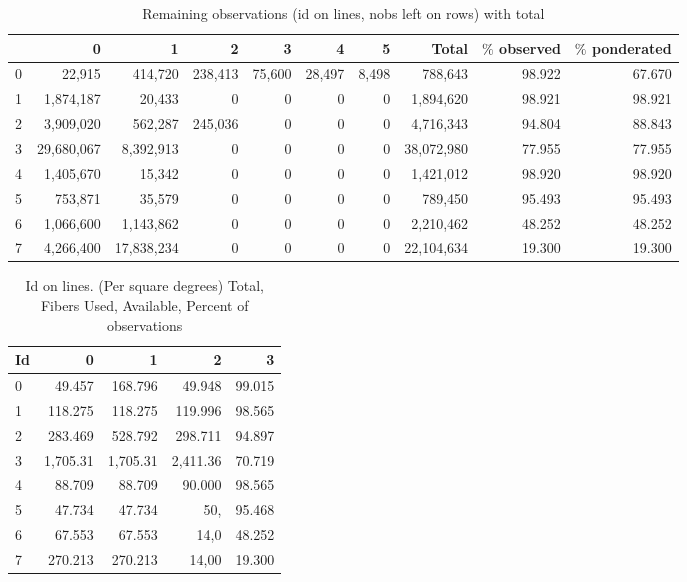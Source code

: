 \documentclass{extarticle}
\begin{document}
\begin{table}[H]\begin{center}
\begin{tabular}{l|rrrrrrrrr}
	~   &         0 &         1 &       2 &      3 &      4 &     5 &         Total & $\%$ observed & $\%$ ponderated\\ \hline
  0   &    22,915 &   414,720 & 238,413 & 75,600 & 28,497 & 8,498 &   788,643 & 98.922 & 67.670\\ 
  1   & 1,874,187 &    20,433 &       0 &      0 &      0 &     0 & 1,894,620 & 98.921 & 98.921\\ 
  2   & 3,909,020 &   562,287 & 245,036 &      0 &      0 &     0 & 4,716,343 & 94.804 & 88.843\\ 
  3   &29,680,067 & 8,392,913 &       0 &      0 &      0 &     0 &38,072,980 & 77.955 & 77.955\\ 
  4   & 1,405,670 &    15,342 &       0 &      0 &      0 &     0 & 1,421,012 & 98.920 & 98.920\\ 
  5   &   753,871 &    35,579 &       0 &      0 &      0 &     0 &   789,450 & 95.493 & 95.493\\ 
  6   & 1,066,600 & 1,143,862 &       0 &      0 &      0 &     0 & 2,210,462 & 48.252 & 48.252\\ 
  7   & 4,266,400 &17,838,234 &       0 &      0 &      0 &     0 &22,104,634 & 19.300 & 19.300\\ 
\end{tabular}
\caption{Remaining observations (id on lines, nobs left on rows) with total}
\label{tab:full14k}
\end{center}
 \end{table}

\begin{table}[H]\begin{center}
\caption{Id on lines. (Per square degrees) Total, Fibers Used, Available, Percent of observations}
\begin{tabular}{l|rrrr} 
   Id &           0  &           1  &           2  &           3   \\ \hline
   0  &      49.457  &     168.796  &      49.948  &      99.015   \\
   1  &     118.275  &     118.275  &     119.996  &      98.565   \\
   2  &     283.469  &     528.792  &     298.711  &      94.897   \\
   3  &    1,705.31  &    1,705.31  &    2,411.36  &      70.719   \\
   4  &      88.709  &      88.709  &      90.000  &      98.565   \\
   5  &      47.734  &      47.734  &         50,  &      95.468   \\
   6  &      67.553  &      67.553  &        14,0  &      48.252   \\
   7  &     270.213  &     270.213  &       14,00  &      19.300   \\
\end{tabular}\end{center}
 \end{table}
\end{document}
